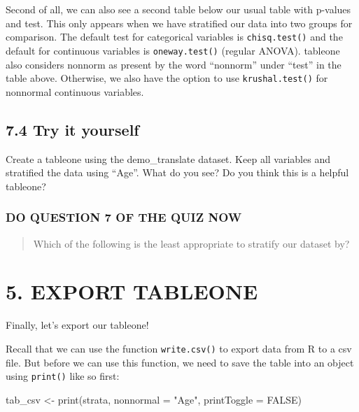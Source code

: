 \documentclass[
]{book}
\newenvironment{Shaded}{\begin{snugshade}}{\end{snugshade}}
\newcommand{\AttributeTok}[1]{\textcolor[rgb]{0.77,0.63,0.00}{#1}}
\newcommand{\ConstantTok}[1]{\textcolor[rgb]{0.00,0.00,0.00}{#1}}
\newcommand{\FunctionTok}[1]{\textcolor[rgb]{0.00,0.00,0.00}{#1}}
\newcommand{\NormalTok}[1]{#1}
\newcommand{\OtherTok}[1]{\textcolor[rgb]{0.56,0.35,0.01}{#1}}
\newcommand{\StringTok}[1]{\textcolor[rgb]{0.31,0.60,0.02}{#1}}
\begin{document}
Second of all, we can also see a second table below our usual table with p-values and test. This only appears when we have stratified our data into two groups for comparison. The default test for categorical variables is \texttt{chisq.test()} and the default for continuous variables is \texttt{oneway.test()} (regular ANOVA). tableone also considers nonnorm as present by the word ``nonnorm'' under ``test'' in the table above. Otherwise, we also have the option to use \texttt{krushal.test()} for nonnormal continuous variables.

\hypertarget{try-it-yourself-37}{%
\subsection{7.4 Try it yourself}\label{try-it-yourself-37}}

Create a tableone using the demo\_translate dataset. Keep all variables and stratified the data using ``Age''. What do you see? Do you think this is a helpful tableone?

\hypertarget{do-question-7-of-the-quiz-now-2}{%
\subsubsection{DO QUESTION 7 OF THE QUIZ NOW}\label{do-question-7-of-the-quiz-now-2}}

\begin{quote}
Which of the following is the least appropriate to stratify our dataset by?
\end{quote}

\hypertarget{export-tableone}{%
\section{5. EXPORT TABLEONE}\label{export-tableone}}

Finally, let's export our tableone!

Recall that we can use the function \texttt{write.csv()} to export data from R to a csv file. But before we can use this function, we need to save the table into an object using \texttt{print()} like so first:

\begin{Shaded}
\begin{Highlighting}[]
\NormalTok{tab\_csv }\OtherTok{\textless{}{-}} \FunctionTok{print}\NormalTok{(strata,}
                 \AttributeTok{nonnormal =} \StringTok{"Age"}\NormalTok{,}
                 \AttributeTok{printToggle =} \ConstantTok{FALSE}\NormalTok{)}
\end{Highlighting}
\end{Shaded}
\end{document}
